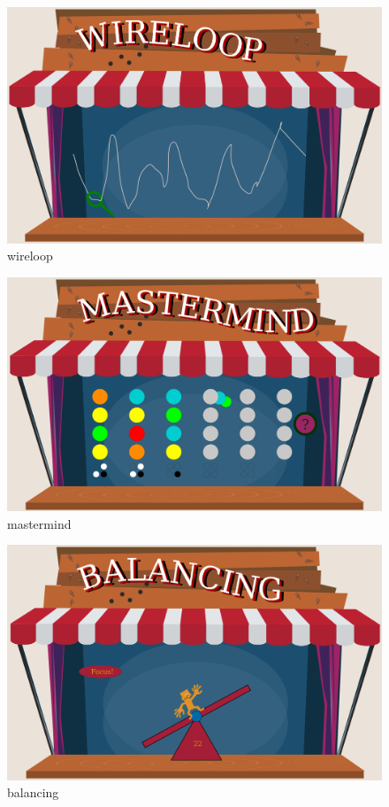 \documentclass{utue} %
\begin{document}
\begin{figure}[]
	\centering
	\includegraphics[width=1.0\columnwidth]{images/wireloop.png}
	\caption{wireloop}
	\label{fig:wireloop}
\end{figure}
\begin{figure}[]
	\centering
	\includegraphics[width=1.0\columnwidth]{images/mastermind.png}
	\caption{mastermind}
	\label{fig:mastermind}
\end{figure}
\begin{figure}[]
	\centering
	\includegraphics[width=1.0\columnwidth]{images/balancing.png}
	\caption{balancing}
	\label{fig:balancing}
\end{figure}
\end{document}
